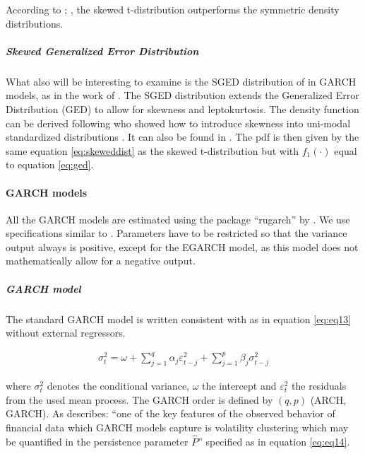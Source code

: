 \documentclass[a4paper, twoside]{templates/ociamthesis}
\begin{document}
\noindent According to \textcite{giot2003}; \textcite{giot2004}, the skewed t-distribution outperforms the symmetric density distributions.

\hypertarget{skewed-generalized-error-distribution}{%
\subparagraph{Skewed Generalized Error Distribution}\label{skewed-generalized-error-distribution}}

\noindent What also will be interesting to examine is the SGED distribution of \textcite{theodossiou2000} in GARCH models, as in the work of \textcite{lee2008}. The SGED distribution extends the Generalized Error Distribution (GED) to allow for skewness and leptokurtosis. The density function can be derived following \textcite{fernández1998} who showed how to introduce skewness into uni-modal standardized distributions \autocite{trottier2015}. It can also be found in \textcite{theodossiou2000}. The pdf is then given by the same equation \eqref{eq:skeweddist} as the skewed t-distribution but with \(f_1(\cdot)\) equal to equation \eqref{eq:ged}.

\hypertarget{garch-models-1}{%
\paragraph{GARCH models}\label{garch-models-1}}

All the GARCH models are estimated using the package ``rugarch'' by \textcite{alexios2020}. We use specifications similar to \textcite{ghalanos2020}. Parameters have to be restricted so that the variance output always is positive, except for the EGARCH model, as this model does not mathematically allow for a negative output.

\hypertarget{garch-model}{%
\subparagraph{GARCH model}\label{garch-model}}

\noindent The standard GARCH model \autocite{bollerslev1986} is written consistent with \textcite{ghalanos2020} as in equation \eqref{eq:eq13} without external regressors.

\begin{align}
\sigma_t^2 = \omega  + \sum\limits_{j = 1}^q {{\alpha_j}\varepsilon _{t-j}^2 +} \sum\limits_{j=1}^p {{\beta_j}\sigma_{t-j}^2} 
 \label{eq:eq13}
\end{align}

\noindent where \(\sigma_t^2\) denotes the conditional variance, \(\omega\) the intercept and \(\varepsilon_t^2\) the residuals from the used mean process. The GARCH order is defined by \((q, p)\) (ARCH, GARCH). As \textcite{ghalanos2020} describes: ``one of the key features of the observed behavior of financial data which GARCH models capture is volatility clustering which may be quantified in the persistence parameter \(\hat{P}\)'' specified as in equation \eqref{eq:eq14}.
\end{document}
